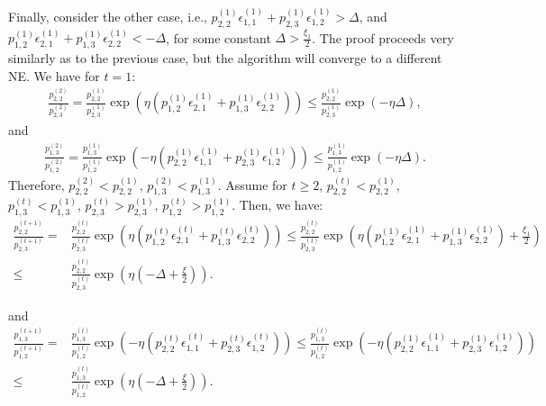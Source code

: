 Finally, consider the other case, i.e., $p^{(1)}_{2,2}\epsilon^{(1)}_{1,1}+p^{(1)}_{2,3}\epsilon^{(1)}_{1,2}>\Delta$, and $p^{(1)}_{1,2}\epsilon^{(1)}_{2,1}+p^{(1)}_{1,3}\epsilon^{(1)}_{2,2}<-\Delta$, for some constant $\Delta>\frac{\xi_1}{2}$. The proof proceeds very similarly as to the previous case, but the algorithm will converge to a different NE. We have for $t=1$: 
\begin{equation*}
    \begin{split}
\frac{p^{(2)}_{2,2}}{p^{(2)}_{2,3}} = \frac{p^{(1)}_{2,2}}{p^{(1)}_{2,3}}\exp\left(\eta\left(p^{(1)}_{1,2}\epsilon^{(1)}_{2,1} + p^{(1)}_{1,3}\epsilon^{(1)}_{2,2}\right)\right) \leq   \frac{p^{(1)}_{2,2}}{p^{(1)}_{2,3}}\exp(-\eta\Delta),  
    \end{split}
\end{equation*}
and 
\begin{equation*}
    \begin{split}
\frac{p^{(2)}_{1,3}}{p^{(2)}_{1,2}} = \frac{p^{(1)}_{1,3}}{p^{(1)}_{1,2}}\exp\left(-\eta\left(p^{(1)}_{2,2}\epsilon^{(1)}_{1,1} + p^{(1)}_{2,3}\epsilon^{(1)}_{1,2}\right)\right) \leq   \frac{p^{(1)}_{1,3}}{p^{(1)}_{1,2}}\exp(-\eta \Delta). 
    \end{split}
\end{equation*}
Therefore, $p_{2,2}^{(2)}< p_{2,2}^{(1)}$,  $p_{1,3}^{(2)}< p_{1,3}^{(1)}$. Assume for $t\geq 2$, $p_{2,2}^{(t)}< p_{2,2}^{(1)}$,  $p_{1,3}^{(t)}< p_{1,3}^{(1)}$,  $p_{2,3}^{(t)}> p_{2,3}^{(1)}$,  $p_{1,2}^{(t)}> p_{1,2}^{(1)}$. 
Then, we have:
\begin{equation*}
    \begin{split}
   \frac{p^{(t+1)}_{2,2}}{p^{(t+1)}_{2,3}} = {} & \frac{p^{(t)}_{2,2}}{p^{(t)}_{2,3}}\exp\left(\eta\left(p^{(t)}_{1,2}\epsilon^{(t)}_{2,1} + p^{(t)}_{1,3}\epsilon^{(t)}_{2,2}\right)\right) \leq \frac{p^{(t)}_{2,2}}{p^{(t)}_{2,3}}\exp\left(\eta\left(p^{(1)}_{1,2}\epsilon^{(1)}_{2,1} + p^{(1)}_{1,3}\epsilon^{(1)}_{2,2}\right)+\frac{\xi_1}{2}\right)\\
   \leq {} & \frac{p^{(t)}_{2,2}}{p^{(t)}_{2,3}} \exp\left(\eta\left(-\Delta+\frac{\xi}{2}\right)\right).
    \end{split}
\end{equation*}


and 
\begin{equation*}
    \begin{split}
        \frac{p^{(t+1)}_{1,3}}{p^{(t+1)}_{1,2}} = {} & \frac{p^{(t)}_{1,3}}{p^{(t)}_{1,2}}\exp\left(-\eta\left(p^{(t)}_{2,2}\epsilon^{(t)}_{1,1} + p^{(t)}_{2,3}\epsilon^{(t)}_{1,2}\right)\right) \leq \frac{p^{(t)}_{1,3}}{p^{(t)}_{1,2}}\exp\left(-\eta\left(p^{(1)}_{2,2}\epsilon^{(1)}_{1,1} + p^{(1)}_{2,3}\epsilon^{(1)}_{1,2}\right)\right)\\
        \leq {} & \frac{p^{(t)}_{1,3}}{p^{(t)}_{1,2}}\exp\left(\eta\left(-\Delta+\frac{\xi}{2}\right)\right).
    \end{split}
\end{equation*}

